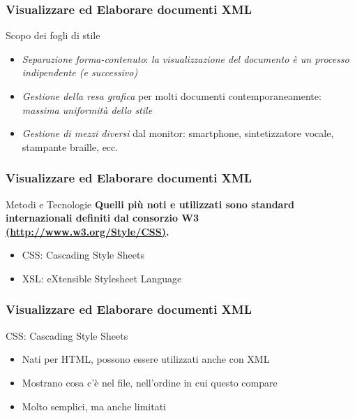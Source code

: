 \documentclass{beamer}
\begin{document}
    \begin{frame}
        \frametitle{Visualizzare ed Elaborare documenti XML}
        \addtocounter{nframe}{1}
        
        \begin{block}{Scopo dei fogli di stile}
           \begin{itemize}
               \item \emph{Separazione forma-contenuto}: \textit{la visualizzazione del documento è un processo indipendente (e successivo)}
               \item \emph{Gestione della resa grafica} per molti documenti contemporaneamente: \textit{massima uniformità dello stile}
               \item \emph{Gestione di mezzi diversi} dal monitor: smartphone, sintetizzatore
               vocale, stampante braille, ecc.
           \end{itemize}
        \end{block}
        
    \end{frame}

    \begin{frame}
        \frametitle{Visualizzare ed Elaborare documenti XML}
        \addtocounter{nframe}{1}
        
        \begin{block}{Metodi e Tecnologie}
            \textbf{Quelli più noti e utilizzati sono standard internazionali definiti dal consorzio W3 \url{(http://www.w3.org/Style/CSS)}.}
           \begin{itemize}
            \item CSS: Cascading Style Sheets
            \item XSL: eXtensible Stylesheet Language
           \end{itemize}
        \end{block}
        
    \end{frame}

    \begin{frame}
        \frametitle{Visualizzare ed Elaborare documenti XML}
        \addtocounter{nframe}{1}
        
        \begin{block}{CSS: Cascading Style Sheets}
           
           \begin{itemize}
               \item Nati per HTML, possono essere utilizzati anche con XML
               \item Mostrano cosa c'è nel file, nell'ordine in cui questo compare
               \item Molto semplici, ma anche limitati
           \end{itemize}
        \end{block}
        
    \end{frame}
\end{document}
